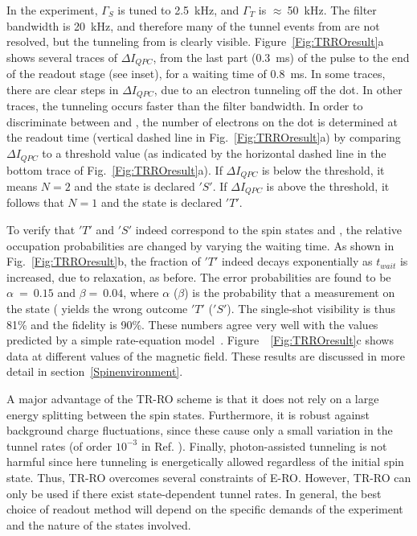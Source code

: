 \documentclass[12pt,aps,nofootinbib]{revtex4-1}
\begin{document}
In the experiment, $\Gamma_S$ is tuned to 2.5~kHz, and $\Gamma_T$
is $\approx\:$50~kHz. The filter bandwidth is 20~kHz, and
therefore many of the tunnel events from  are not
resolved, but the tunneling from  is clearly visible.
Figure~\ref{Fig:TRROresult}a shows several traces of $\Delta
I_{QPC}$, from the last part (0.3~ms) of the pulse to the end of
the readout stage (see inset), for a waiting time of 0.8~ms. In
some traces, there are clear steps in $\Delta I_{QPC}$, due to an
electron tunneling off the dot. In other traces, the tunneling
occurs faster than the filter bandwidth. In order to discriminate
between  and , the number of electrons on the
dot is determined at the readout time (vertical dashed line in
Fig.~\ref{Fig:TRROresult}a) by comparing $\Delta I_{QPC}$ to a
threshold value (as indicated by the horizontal dashed line in the
bottom trace of Fig.~\ref{Fig:TRROresult}a). If $\Delta I_{QPC}$
is below the threshold, it means $N\!=\!2$ and the state is
declared $'S'$. If $\Delta I_{QPC}$ is above the threshold, it
follows that $N\!=\!1$ and the state is declared $'T'$.

To  verify that $'T'$ and $'S'$ indeed correspond to the spin
states  and , the relative occupation
probabilities are changed by varying the waiting time. As shown in
Fig.~\ref{Fig:TRROresult}b, the fraction of $'T'$ indeed decays
exponentially as $t_{wait}$ is increased, due to relaxation, as before. The error probabilities are
found to be $\alpha\!~=\!~0.15$ and $\beta\!=\!~0.04$, where $\alpha$ ($\beta$) is the probability that a measurement on the state  ( yields the wrong outcome $'T'$ ($'S'$). The single-shot visibility is thus
81\% and the fidelity is 90\%. These numbers agree very well with
the values predicted by a simple rate-equation
model~\cite{HansonPRL2005}. Figure~~\ref{Fig:TRROresult}c shows
data at different values of the magnetic field. These results are
discussed in more detail in section~\ref{Spinenvironment}.

A major advantage of the TR-RO scheme is that it does not rely on
a large energy splitting between the spin states. Furthermore, it
is robust against background charge fluctuations, since these
cause only a small variation in the tunnel rates (of order
$10^{-3}$ in Ref. \cite{FujisawaChargeNoise}). Finally,
photon-assisted tunneling is not harmful since here tunneling is
energetically allowed regardless of the initial spin state. Thus,
TR-RO overcomes several constraints of E-RO. However, TR-RO can
only be used if there exist state-dependent tunnel rates. In
general, the best choice of readout method will depend on the
specific demands of the experiment and the nature of the states
involved.
\end{document}
